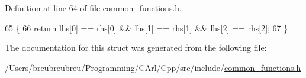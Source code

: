 Definition at line 64 of file common\+\_\+functions.\+h.


\begin{DoxyCode}
65     \{
66         \textcolor{keywordflow}{return} lhs[0] == rhs[0] && lhs[1] == rhs[1] && lhs[2] == rhs[2];
67     \}
\end{DoxyCode}


The documentation for this struct was generated from the following file\+:\begin{DoxyCompactItemize}
\item 
/\+Users/breubreubreu/\+Programming/\+C\+Arl/\+Cpp/src/include/\hyperlink{common__functions_8h}{common\+\_\+functions.\+h}\end{DoxyCompactItemize}
